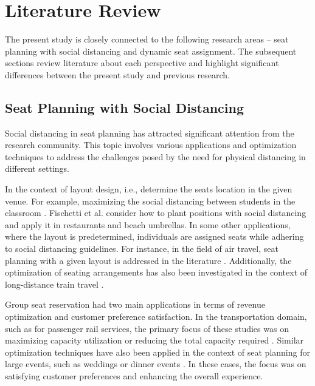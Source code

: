 \section{Literature Review}

The present study is closely connected to the following research areas -- seat planning with social distancing and dynamic seat assignment. The subsequent sections review literature about each perspective and highlight significant differences between the present study and previous research.


\subsection{Seat Planning with Social Distancing}
Social distancing in seat planning has attracted significant attention from the research community. This topic involves various applications and optimization techniques to address the challenges posed by the need for physical distancing in different settings. 


In the context of layout design, i.e., determine the seats location in the given venue. For example, maximizing the social distancing between students in the classroom \cite{bortolete2022support}. Fischetti et al.\cite{fischetti2023safe} consider how to plant positions with social distancing and apply it in restaurants and beach umbrellas. In some other applications, where the layout is predetermined, individuals are assigned seats while adhering to social distancing guidelines. For instance, in the field of air travel, seat planning with a given layout is addressed in the literature \cite{ghorbani2020model, salari2022social}. Additionally, the optimization of seating arrangements has also been investigated in the context of long-distance train travel \cite{haque2022optimization}. 

Group seat reservation had two main applications in terms of revenue optimization and customer preference satisfaction. In the transportation domain, such as for passenger rail services, the primary focus of these studies was on maximizing capacity utilization or reducing the total capacity required \cite{clausen2010off, deplano2019offline}. Similar optimization techniques have also been applied in the context of seat planning for large events, such as weddings or dinner events \cite{lewis2016creating}. In these cases, the focus was on satisfying customer preferences and enhancing the overall experience.


